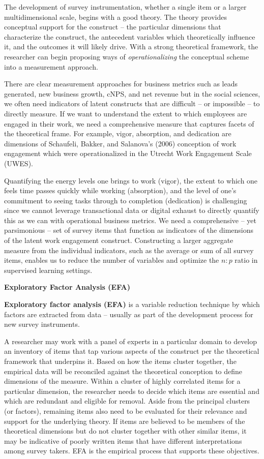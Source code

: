 \documentclass[
]{book}
\begin{document}
The development of survey instrumentation, whether a single item or a larger multidimensional scale, begins with a good theory. The theory provides conceptual support for the construct -- the particular dimensions that characterize the construct, the antecedent variables which theoretically influence it, and the outcomes it will likely drive. With a strong theoretical framework, the researcher can begin proposing ways of \emph{operationalizing} the conceptual scheme into a measurement approach.

There are clear measurement approaches for business metrics such as leads generated, new business growth, cNPS, and net revenue but in the social sciences, we often need indicators of latent constructs that are difficult -- or impossible -- to directly measure. If we want to understand the extent to which employees are engaged in their work, we need a comprehensive measure that captures facets of the theoretical frame. For example, vigor, absorption, and dedication are dimensions of Schaufeli, Bakker, and Salanova's (2006) conception of work engagement which were operationalized in the Utrecht Work Engagement Scale (UWES).

Quantifying the energy levels one brings to work (vigor), the extent to which one feels time passes quickly while working (absorption), and the level of one's commitment to seeing tasks through to completion (dedication) is challenging since we cannot leverage transactional data or digital exhaust to directly quantify this as we can with operational business metrics. We need a comprehensive -- yet parsimonious -- set of survey items that function as indicators of the dimensions of the latent work engagement construct. Constructing a larger aggregate measure from the individual indicators, such as the average or sum of all survey items, enables us to reduce the number of variables and optimize the \(n:p\) ratio in supervised learning settings.

\textbf{Exploratory Factor Analysis (EFA)}

\textbf{Exploratory factor analysis (EFA)} is a variable reduction technique by which factors are extracted from data -- usually as part of the development process for new survey instruments.

A researcher may work with a panel of experts in a particular domain to develop an inventory of items that tap various aspects of the construct per the theoretical framework that underpins it. Based on how the items cluster together, the empirical data will be reconciled against the theoretical conception to define dimensions of the measure. Within a cluster of highly correlated items for a particular dimension, the researcher needs to decide which items are essential and which are redundant and eligible for removal. Aside from the principal clusters (or factors), remaining items also need to be evaluated for their relevance and support for the underlying theory. If items are believed to be members of the theoretical dimensions but do not cluster together with other similar items, it may be indicative of poorly written items that have different interpretations among survey takers. EFA is the empirical process that supports these objectives.
\end{document}
